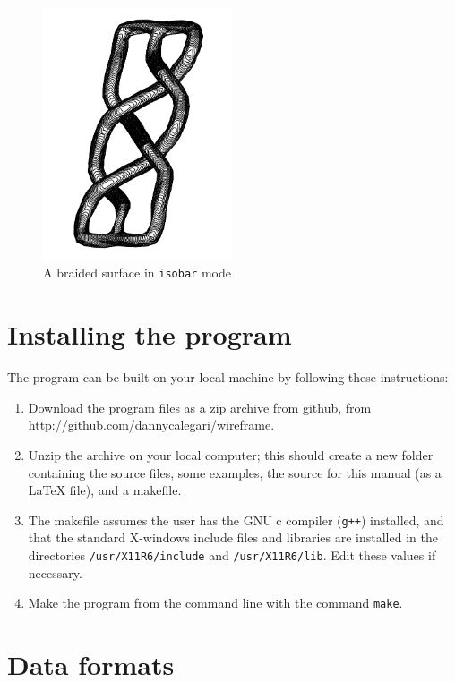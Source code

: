 \documentclass[12pt]{article}
\begin{document}
\begin{figure}[ht]
  \caption{A braided surface in {\tt isobar} mode}\label{braid_iso}
  \centering
    \includegraphics[width=0.5\textwidth]{braid_iso}
\end{figure}



\section{Installing the program}\label{section:installation}

The program can be built on your local machine by following these instructions:

\begin{enumerate}
\item{Download the program files as a zip archive from github, from 
\url{http://github.com/dannycalegari/wireframe}.}
\item{Unzip the archive on your local computer; this should create a new folder containing
the source files, some examples, the source for this manual (as a LaTeX file), and a
makefile.}
\item{The makefile assumes the user has the GNU c compiler ({\tt g++}) installed, and that the standard
X-windows include files and libraries are installed in the directories {\tt /usr/X11R6/include}
and {\tt /usr/X11R6/lib}. Edit these values if necessary.}
\item{Make the program from the command line with the command {\tt make}.}
\end{enumerate}


\section{Data formats}\label{section:data_format}
\end{document}
